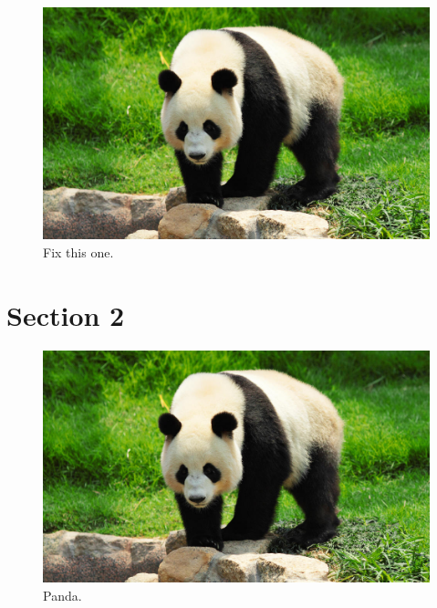 \documentclass{bioinfo}
\begin{document}
\begin{figure}[ht!]
\includegraphics[scale=0.5]{panda.jpg}
\caption{Fix this one.}
\label{panda2}
\end{figure}

\blindtext
\blindtext
\blindtext
\blindtext
\blindtext
\blindtext
\section{Section 2}
\blindtext
\begin{figure}[h!tb]
\centerline{\includegraphics[width=\columnwidth]{panda.jpg}}
\caption{Panda.
\label{panda3}}
\end{figure}
\end{document}
